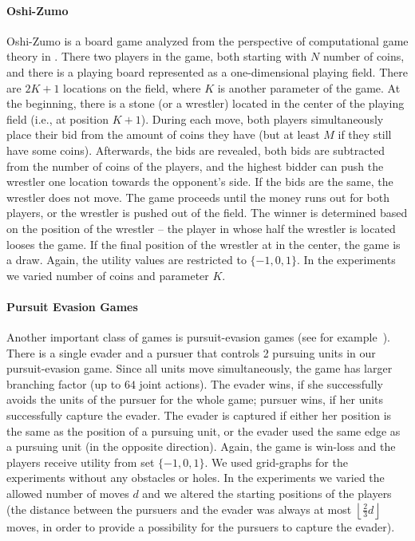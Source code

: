 \paragraph{\textbf{Oshi-Zumo}}
Oshi-Zumo is a board game analyzed from the perspective of computational game theory in \cite{buro2003}.
There two players in the game, both starting with $N$ number of coins, and there is a playing board represented as a one-dimensional playing field. 
There are $2K+1$ locations on the field, where $K$ is another parameter of the game.
At the beginning, there is a stone (or a wrestler) located in the center of the playing field (i.e., at position $K+1$).
During each move, both players simultaneously place their bid from the amount of coins they have (but at least $M$ if they still have some coins).
Afterwards, the bids are revealed, both bids are subtracted from the number of coins of the players, and the highest bidder can push the wrestler one location towards the opponent's side.
If the bids are the same, the wrestler does not move. 
The game proceeds until the money runs out for both players, or the wrestler is pushed out of the field. 
The winner is determined based on the position of the wrestler -- the player in whose half the wrestler is located looses the game. 
If the final position of the wrestler at in the center, the game is a draw.
Again, the utility values are restricted to $\lbrace -1, 0, 1 \rbrace$.
In the experiments we varied number of coins and parameter $K$.

\paragraph{\textbf{Pursuit Evasion Games}}
Another important class of games is pursuit-evasion games (see for example~\cite{nguyen2013monte}).
There is a single evader and a pursuer that controls 2 pursuing units in our pursuit-evasion game. 
Since all units move simultaneously, the game has larger branching factor (up to $64$ joint actions).
The evader wins, if she successfully avoids the units of the pursuer for the whole game; pursuer wins, if her units successfully capture the evader. The evader is captured if either her position is the same as the position of a pursuing unit, or the evader used the same edge as a pursuing unit (in the opposite direction). 
Again, the game is win-loss and the players receive utility from set $\lbrace -1, 0, 1 \rbrace$.
We used grid-graphs for the experiments without any obstacles or holes.
In the experiments we varied the allowed number of moves $d$ and we altered the starting positions of the players (the distance between the pursuers and the evader was always at most $\left\lfloor\frac{2}{3} d\right\rfloor$ moves, in order to provide a possibility for the pursuers to capture the evader).


